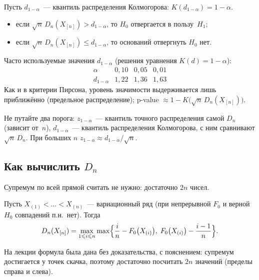 Пусть $d_{1-\alpha}$~--- квантиль распределения Колмогорова: $K(d_{1-\alpha}) = 1 - \alpha$.
\begin{itemize}
  \item если $\sqrt{n}\, D_n(X_{[n]}) > d_{1-\alpha}$, то $H_0$ отвергается в пользу~$H_1$;
  \item если $\sqrt{n}\, D_n(X_{[n]}) \le d_{1-\alpha}$, то оснований отвергнуть $H_0$ нет.
\end{itemize}

\begin{addendum}
  Часто используемые значения $d_{1-\alpha}$ (решения уравнения $K(d) = 1 - \alpha$):
  \[
    \begin{array}{c|ccc}
      \alpha         & 0{,}10  & 0{,}05  & 0{,}01 \\ \hline
      d_{1-\alpha}   & 1{,}22  & 1{,}36  & 1{,}63
    \end{array}
  \]
  Как и в критерии Пирсона, уровень значимости выдерживается лишь приближённо
  (предельное распределение); p-value $\approx 1 - K\bigl(\sqrt{n}\, D_n(X_{[n]})\bigr)$.

  \smallskip
  Не путайте два порога: $z_{1-\alpha}$~--- квантиль точного распределения
  самой $D_n$ (зависит от~$n$), $d_{1-\alpha}$~--- квантиль распределения Колмогорова,
  с ним сравнивают $\sqrt{n}\, D_n$. При больших $n$ $z_{1-\alpha} \approx d_{1-\alpha} / \sqrt{n}$.
\end{addendum}

\subsection{Как вычислить \texorpdfstring{$D_n$}{Dn}}
\label{lec05:computing}

Супремум по всей прямой считать не нужно: достаточно $2n$ чисел.

\begin{proposition}
  \label{lec05:formula}
  Пусть $X_{(1)} < \ldots < X_{(n)}$~--- вариационный ряд (при непрерывной $F_0$ и
  верной~$H_0$ совпадений п.н.\ нет). Тогда
  \[
    D_n(X_{[n]}) = \max_{1 \le i \le n}
      \max\Bigl\{ \frac{i}{n} - F_0\bigl(X_{(i)}\bigr),\;
                  F_0\bigl(X_{(i)}\bigr) - \frac{i-1}{n} \Bigr\}.
  \]
\end{proposition}

На лекции формула была дана без доказательства, с пояснением: супремум
достигается у точек скачка, поэтому достаточно посчитать $2n$ значений
(пределы справа и слева).

